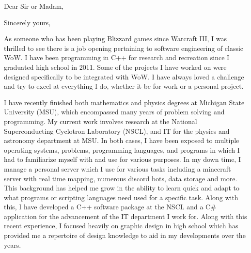 \documentclass[11pt,a4paper,sans]{moderncv} %
\begin{document}
\makecvtitle 



\date{\today} %
\opening{Dear Sir or Madam,} %

\closing{Sincerely yours,} %

\makelettertitle %

\hspace{1cm} As someone who has been playing Blizzard games since Warcraft III, I was thrilled to see there is a job opening pertaining to software engineering of classic WoW. I have been programming in C++ for research and recreation since I graduated high school in 2011. Some of the projects I have worked on were designed specifically to be integrated with WoW. I have always loved a challenge and try to excel at everything I do, whether it be for work or a personal project. 

\hspace{1cm} I have recently finished both mathematics and physics degrees at Michigan State University (MSU), which encompassed many years of problem solving and programming. My current work involves research at the National Superconducting Cyclotron Laboratory (NSCL), and IT for the physics and astronomy department at MSU. In both cases, I have been exposed to multiple operating systems, problems, programming languages, and programs in which I had to familiarize myself with and use for various purposes. In my down time, I manage a personal server which I use for various tasks including a minecraft server with real time mapping, numerous discord bots, data storage and more. This background has helped me grow in the ability to learn quick and adapt to what programs or scripting languages need used for a specific task. Along with this, I have developed a C++ software package at the NSCL and a C\# application for the advancement of the IT department I work for. Along with this recent experience, I focused heavily on graphic design in high school which has provided me a repertoire of design knowledge to aid in my developments over the years.
\end{document}
